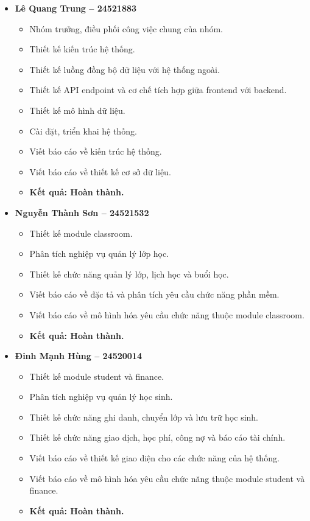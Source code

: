 \documentclass[12pt,a4paper]{article}
\begin{document}
\begin{itemize}[leftmargin=*]
    \item \textbf{Lê Quang Trung -- 24521883}
    \begin{itemize}
        \item Nhóm trưởng, điều phối công việc chung của nhóm.
        \item Thiết kế kiến trúc hệ thống.
        \item Thiết kế luồng đồng bộ dữ liệu với hệ thống ngoài.
        \item Thiết kế API endpoint và cơ chế tích hợp giữa frontend với backend.
        \item Thiết kế mô hình dữ liệu.
        \item Cài đặt, triển khai hệ thống.
        \item Viết báo cáo về kiến trúc hệ thống.
        \item Viết báo cáo về thiết kế cơ sở dữ liệu.
        \item \textbf{Kết quả: Hoàn thành.}
    \end{itemize}

    \item \textbf{Nguyễn Thành Sơn -- 24521532}
    \begin{itemize}
        \item Thiết kế module classroom.
        \item Phân tích nghiệp vụ quản lý lớp học.
        \item Thiết kế chức năng quản lý lớp, lịch học và buổi học.
        \item Viết báo cáo về đặc tả và phân tích yêu cầu chức năng phần mềm.
        \item Viết báo cáo về mô hình hóa yêu cầu chức năng thuộc module classroom.
        \item \textbf{Kết quả: Hoàn thành.}
    \end{itemize}

    \item \textbf{Đinh Mạnh Hùng -- 24520014}
    \begin{itemize}
        \item Thiết kế module student và finance.
        \item Phân tích nghiệp vụ quản lý học sinh.
        \item Thiết kế chức năng ghi danh, chuyển lớp và lưu trữ học sinh.
        \item Thiết kế chức năng giao dịch, học phí, công nợ và báo cáo tài chính.
        \item Viết báo cáo về thiết kế giao diện cho các chức năng của hệ thống.
        \item Viết báo cáo về mô hình hóa yêu cầu chức năng thuộc module student và finance.
        \item \textbf{Kết quả: Hoàn thành.}
    \end{itemize}


\end{itemize}
\end{document}
